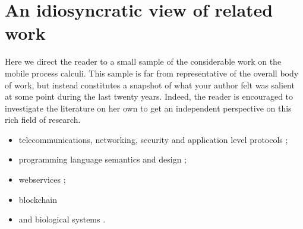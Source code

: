 \section{An idiosyncratic view of related work}

Here we direct the reader to a small sample of the considerable work
on the mobile process calculi. This sample is far from representative
of the overall body of work, but instead constitutes a snapshot of
what your author felt was salient at some point during the last twenty
years. Indeed, the reader is encouraged to investigate the literature
on her own to get an independent perspective on this rich field of
research.

\begin{itemize}
\item telecommunications, networking, security and application level protocols
\cite{DBLP:conf/popl/AbadiB02} 
\cite{DBLP:journals/tcs/AbadiB03} 
\cite{DBLP:conf/epew/BrownLM05} 
\cite{DBLP:conf/fossacs/LaneveZ05}; 
\item programming language semantics and design
\cite{DBLP:conf/epew/BrownLM05}
\cite{djoin}
\cite{DBLP:conf/afp/FournetFMS02}
\cite{DBLP:journals/toplas/SewellWU10};
\item webservices
\cite{DBLP:conf/epew/BrownLM05}
\cite{DBLP:conf/fossacs/LaneveZ05}
\cite{DBLP:conf/wise/Meredith03};
\item{blockchain}
  \cite{meredith_2017}
\item and biological systems
\cite{DBLP:conf/cmsb/Cardelli04}
\cite{DBLP:conf/esop/DanosL03}
\cite{DBLP:conf/psb/RegevSS01}
\cite{DBLP:journals/ipl/PriamiRSS01}.
\end{itemize}


